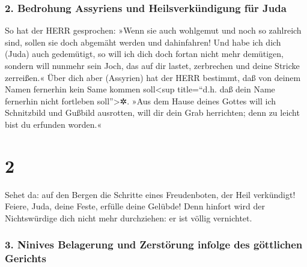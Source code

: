 \hypertarget{bedrohung-assyriens-und-heilsverkuxfcndigung-fuxfcr-juda}{%
\subsubsection{2. Bedrohung Assyriens und Heilsverkündigung für
Juda}\label{bedrohung-assyriens-und-heilsverkuxfcndigung-fuxfcr-juda}}

 So hat der HERR gesprochen: »Wenn sie auch wohlgemut und
noch so zahlreich sind, sollen sie doch abgemäht werden und dahinfahren!
Und habe ich dich (Juda) auch gedemütigt, so will ich dich doch fortan
nicht mehr demütigen,  sondern will nunmehr sein Joch,
das auf dir lastet, zerbrechen und deine Stricke zerreißen.«
 Über dich aber (Assyrien) hat der HERR bestimmt, daß von
deinem Namen fernerhin kein Same kommen soll\textless sup title=``d.h.
daß dein Name fernerhin nicht fortleben soll''\textgreater✲. »Aus dem
Hause deines Gottes will ich Schnitzbild und Gußbild ausrotten, will dir
dein Grab herrichten; denn zu leicht bist du erfunden worden.«

\hypertarget{section-1}{%
\section{2}\label{section-1}}

 Sehet da: auf den Bergen die Schritte eines Freudenboten,
der Heil verkündigt! Feiere, Juda, deine Feste, erfülle deine Gelübde!
Denn hinfort wird der Nichtswürdige dich nicht mehr durchziehen: er ist
völlig vernichtet.

\hypertarget{ninives-belagerung-und-zerstuxf6rung-infolge-des-guxf6ttlichen-gerichts}{%
\subsubsection{3. Ninives Belagerung und Zerstörung infolge des
göttlichen
Gerichts}\label{ninives-belagerung-und-zerstuxf6rung-infolge-des-guxf6ttlichen-gerichts}}

